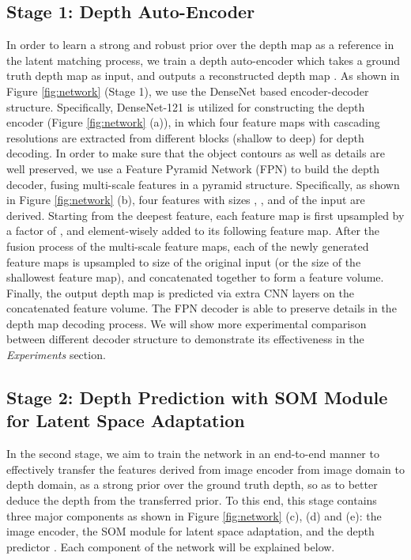 \documentclass[letterpaper]{article} \usepackage{aaai20}  \usepackage{times}  \usepackage{helvet} \usepackage{courier}  \usepackage{graphicx} \frenchspacing  \setlength{\pdfpagewidth}{8.5in}  \setlength{\pdfpageheight}{11in}  \usepackage{epsfig}
\begin{document}
    \subsection{Stage 1: Depth Auto-Encoder}
    \label{subsec:ae}
    In order to learn a strong and robust prior over the depth map as a reference in the latent matching process, we train a depth auto-encoder  which takes a ground truth depth map  as input, and outputs a reconstructed depth map . As shown in Figure \ref{fig:network} (Stage 1), we use the DenseNet based encoder-decoder structure. Specifically, DenseNet-121 is utilized for constructing the depth encoder (Figure \ref{fig:network} (a)), in which four feature maps with cascading resolutions are extracted from different blocks (shallow to deep) for depth decoding. In order to make sure that the object contours as well as details are well preserved, we use a Feature Pyramid Network (FPN) to build the depth decoder, fusing multi-scale features in a pyramid structure. Specifically, as shown in Figure \ref{fig:network} (b), four features with sizes , ,  and  of the input are derived. Starting from the deepest feature, each feature map is first upsampled by a factor of , and element-wisely added to its following feature map. After the fusion process of the multi-scale feature maps, each of the newly generated feature maps is upsampled to size of  the original input (or the size of the shallowest feature map), and concatenated together to form a feature volume. Finally, the output depth map is predicted via extra CNN layers on the concatenated feature volume. The FPN decoder is able to preserve details in the depth map decoding process. We will show more experimental comparison between different decoder structure to demonstrate its effectiveness in the \emph{Experiments} section.
    
    \subsection{Stage 2: Depth Prediction with SOM Module for Latent Space Adaptation}
     In the second stage, we aim to train the network in an end-to-end manner to effectively transfer the features derived from image encoder  from image domain to depth domain, as a strong prior over the ground truth depth, so as to better deduce the depth from the transferred prior. To this end, this stage contains three major components as shown in Figure \ref{fig:network} (c), (d) and (e): the image encoder, the SOM module for latent space adaptation, and the depth predictor . Each component of the network will be explained below. 
    
\end{document}
